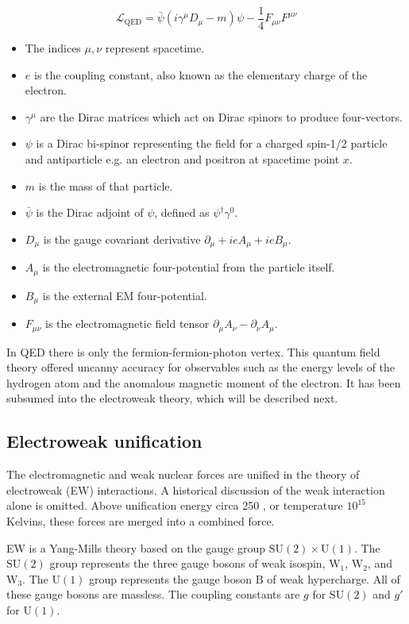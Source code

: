 \begin{equation}
\mathcal{L}_\mathrm{QED} = \bar{\psi}\left( i\gamma^\mu D_\mu - m \right) \psi - \frac{1}{4} F_{\mu\nu} F^{\mu\nu}
\end{equation}

\begin{itemize}
  \setlength\itemsep{0em}
  \item The indices $\mu,\nu$ represent spacetime.
  \item $e$ is the coupling constant, also known as the elementary charge of the electron.
  \item $\gamma^\mu$ are the Dirac matrices which act on Dirac spinors to produce four-vectors.
  \item $\psi$ is a Dirac bi-spinor representing the field for a charged spin-1/2 particle and antiparticle e.g. an electron and positron at spacetime point $x$.
  \item $m$ is the mass of that particle.
  \item $\bar{\psi}$ is the Dirac adjoint of $\psi$, defined as $\psi^\dagger \gamma^0$.
  \item $D_\mu$ is the gauge covariant derivative $\partial_\mu + ieA_\mu + ieB_\mu$.
  \item $A_\mu$ is the electromagnetic four-potential from the particle itself.
  \item $B_\mu$ is the external EM four-potential.
  \item $F_{\mu\nu}$ is the electromagnetic field tensor $\partial_\mu A_\nu - \partial_\nu A_\mu$.
\end{itemize}

In QED there is only the fermion-fermion-photon vertex. 
This quantum field theory offered uncanny accuracy for observables such as
the energy levels of the hydrogen atom and the anomalous magnetic moment of the electron.
It has been subsumed into the electroweak theory, which will be described next.

\subsection{Electroweak unification}
\label{electroweak}
The electromagnetic and weak nuclear forces are unified in the theory of electroweak (EW) interactions.
A historical discussion of the weak interaction alone is omitted.
Above unification energy circa 250 \GeV, or temperature $10^{15}$ Kelvins, these forces are merged into a combined force.

EW is a Yang-Mills theory based on the gauge group $\mathrm{SU}(2) \times \mathrm{U}(1)$.
The $\mathrm{SU}(2)$ group represents the three gauge bosons of weak isospin, 
$\mathrm{W}_1$, $\mathrm{W}_2$, and $\mathrm{W}_3$.
The $\mathrm{U}(1)$ group represents the gauge boson $\mathrm{B}$ of weak hypercharge.
All of these gauge bosons are massless. 
The coupling constants are $g$ for $\mathrm{SU}(2)$ and $g'$ for $\mathrm{U}(1)$.


